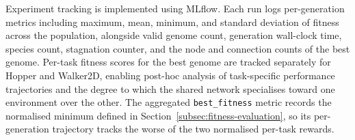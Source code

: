 \documentclass[12pt]{article}
\begin{document}
Experiment tracking is implemented using MLflow.
Each run logs per-generation metrics including maximum, mean, minimum, and standard deviation of fitness across the population, alongside valid genome count, generation wall-clock time, species count, stagnation counter, and the node and connection counts of the best genome.
Per-task fitness scores for the best genome are tracked separately for Hopper and Walker2D, enabling post-hoc analysis of task-specific performance trajectories and the degree to which the shared network specialises toward one environment over the other.
The aggregated \texttt{best\_fitness} metric records the normalised minimum defined in Section~\ref{subsec:fitness-evaluation}, so its per-generation trajectory tracks the worse of the two normalised per-task rewards.

\end{document}
